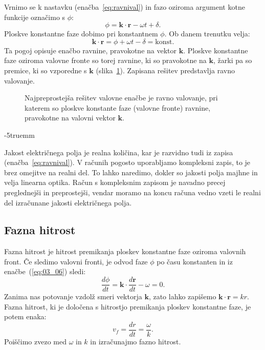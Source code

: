 Vrnimo se k nastavku (enačba~\ref{eq:ravnival}) in fazo oziroma
argument kotne funkcije označimo s $\phi$:
\begin{equation}
\phi = \mathbf{k}\cdot \mathbf{r} - \omega t + \delta.
\label{eq:03_06}
\end{equation}
Ploskve konstantne faze dobimo pri konstantnem $\phi$. Ob danem trenutku velja:
\begin{equation}
\mathbf{k}\cdot \mathbf{r} = \phi + \omega t - \delta = \mathrm{konst.}
\label{eq:03_08}
\end{equation}
Ta pogoj opisuje enačbo ravnine, pravokotne na vektor $\mathbf{k}$. Ploskve konstantne faze
oziroma valovne fronte so torej ravnine, ki so pravokotne na $\mathbf{k}$, žarki pa so premice, ki 
so vzporedne s $\mathbf{k}$ (slika~\ref{fig:03_ravnival}). Zapisana rešitev predstavlja ravno valovanje.
\begin{figure}[ht]
\centering
\def\svgwidth{90truemm} 

\caption{Najpreprostejša rešitev valovne enačbe je ravno valovanje, pri katerem so ploskve konstante
faze (valovne fronte) ravnine, pravokotne na valovni vektor $\mathbf{k}$.}
\label{fig:03_ravnival}
\end{figure}
\vglue-5truemm
\begin{remark}
Jakost električnega polja je realna količina, kar je razvidno tudi iz zapisa (enačba~\ref{eq:ravnival}). 
V računih pogosto uporabljamo kompleksni zapis, to je brez omejitve na realni del. To lahko 
naredimo, dokler so jakosti polja majhne in velja linearna optika. Račun s kompleksnim zapisom
je navadno precej preglednejši in preprostejši, vendar moramo na koncu računa vedno vzeti le
realni del izračunane jakosti električnega polja. 
\end{remark}

\subsection*{Fazna hitrost}
Fazna hitrost je hitrost premikanja ploskev konstantne faze oziroma valovnih front. 
Če sledimo valovni fronti, je odvod faze $\phi$ po času konstanten in iz enačbe~(\ref{eq:03_06}) 
sledi:
\begin{equation}
\frac{d\phi}{dt}= \mathbf{k}\cdot \frac{d\mathbf{r}}{dt} - \omega = 0.
\label{eq:03_09}
\end{equation}
Zanima nas potovanje vzdolž smeri vektorja $\mathbf{k}$, 
zato lahko zapišemo $\mathbf{k}\cdot \mathbf{r} = kr$. Fazna hitrost, ki je določena 
s hitrostjo premikanja ploskev konstantne faze, je potem enaka:
\begin{equation}
v_f = \frac{dr}{dt} = \frac{\omega}{k}.
\label{eq:03_10}
\end{equation}
Poiščimo zvezo med $\omega$ in $k$ in izračunajmo fazno hitrost.

